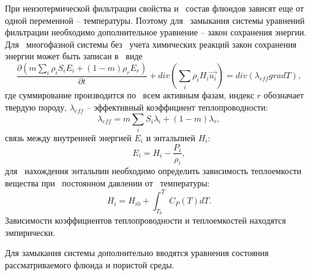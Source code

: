 При неизотермической фильтрации свойства и~ состав флюидов зависят еще от~ одной переменной -- температуры.
Поэтому для~ замыкания системы уравнений фильтрации необходимо дополнительное уравнение --
закон сохранения энергии. Для~ многофазной системы без~ учета химических реакций закон сохранения энергии 
может быть записан в~ виде
\begin{equation}
\label{Energy_law}
  \frac{\partial \left(m {\sum\limits_{i}{\rho_i S_i E_i}} + (1-m){\rho_r E_r}\right)}{\partial t}
    + div(\sum_{i}{\rho_i H_i \overrightarrow{u_i}}) = div(\lambda_{eff} grad T),
\end{equation}
где суммирование производится по~ всем активным фазам, индекс $r$ обозначает твердую породу,
$\lambda_{eff}$ -- эффективный коэффициент теплопроводности:
\begin{equation}
\lambda_{eff}=m\sum_i{S_i\lambda_i} + (1-m)\lambda_r,
\end{equation}
связь между внутренней энергией $E_i$ и энтальпией $H_i$:
\begin{equation}
E_i=H_i-\frac{P_i}{\rho_i},
\end{equation} для~ нахождения энтальпии необходимо определить зависимость теплоемкости
вещества при~ постоянном давлении от~ температуры:
\begin{equation}
H_i=H_{i0}+\int_{T_0}^{T}{C_P(T)dT}.
\end{equation}
Зависимости коэффициентов теплопроводности и теплоемкостей находятся эмпирически.

Для замыкания системы дополнительно вводятся уравнения состояния рассматриваемого флюида
и пористой среды.
